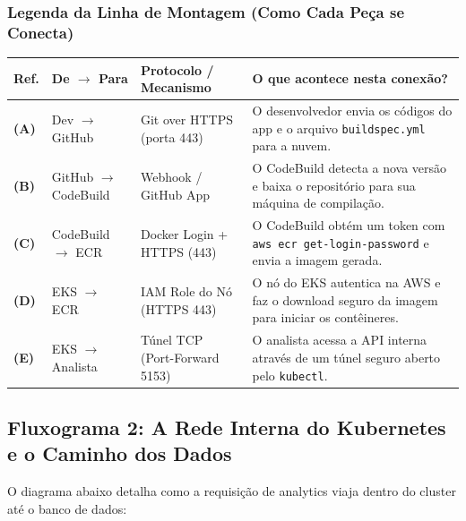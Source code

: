 \documentclass[11pt,a4paper]{article}
\begin{document}
\subsubsection*{Legenda da Linha de Montagem (Como Cada Peça se Conecta)}
\begin{center}
\small
\begin{tabular}{p{0.8cm} p{3.2cm} p{4.2cm} p{7.0cm}}
\toprule
\textbf{Ref.} & \textbf{De $\rightarrow$ Para} & \textbf{Protocolo / Mecanismo} & \textbf{O que acontece nesta conexão?} \\
\midrule
\textbf{(A)} & Dev $\rightarrow$ GitHub & Git over HTTPS (porta 443) & O desenvolvedor envia os códigos do app e o arquivo \texttt{buildspec.yml} para a nuvem. \\
\textbf{(B)} & GitHub $\rightarrow$ CodeBuild & Webhook / GitHub App & O CodeBuild detecta a nova versão e baixa o repositório para sua máquina de compilação. \\
\textbf{(C)} & CodeBuild $\rightarrow$ ECR & Docker Login + HTTPS (443) & O CodeBuild obtém um token com \texttt{aws ecr get-login-password} e envia a imagem gerada. \\
\textbf{(D)} & EKS $\rightarrow$ ECR & IAM Role do Nó (HTTPS 443) & O nó do EKS autentica na AWS e faz o download seguro da imagem para iniciar os contêineres. \\
\textbf{(E)} & EKS $\rightarrow$ Analista & Túnel TCP (Port-Forward 5153) & O analista acessa a API interna através de um túnel seguro aberto pelo \texttt{kubectl}. \\
\bottomrule
\end{tabular}
\end{center}

\vspace{0.3cm}

\subsection{Fluxograma 2: A Rede Interna do Kubernetes e o Caminho dos Dados}
O diagrama abaixo detalha como a requisição de analytics viaja dentro do cluster até o banco de dados:
\end{document}
